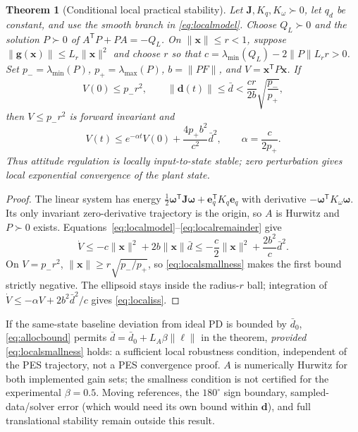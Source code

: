 \documentclass[letterpaper, 10 pt, conference]{ieeeconf}
\newtheorem{theorem}{Theorem}
\newcommand{\T}{^{\mathsf T}}
\begin{document}
\begin{theorem}[Conditional local practical stability]
\label{thm:local}
Let $\bm J,K_q,K_\omega\succ0$, let $q_d$ be constant, and use the smooth
branch in \eqref{eq:localmodel}. Choose $Q_L\succ0$ and the solution
$P\succ0$ of $A\T P+PA=-Q_L$. On $\|\bm x\|\le r<1$, suppose
$\|\bm g(\bm x)\|\le L_r\|\bm x\|^2$ and choose $r$ so that
$c=\lambda_{\min}(Q_L)-2\|P\|L_r r>0$.
Set $p_- =\lambda_{\min}(P)$, $p_+=\lambda_{\max}(P)$,
$b=\|PF\|$, and $V=\bm x\T P\bm x$. If
\begin{equation}
 V(0)\le p_-r^2,\qquad
 \|\bm d(t)\|\le\bar d<\frac{cr}{2b}\sqrt{\frac{p_-}{p_+}},
 \label{eq:localsmallness}
\end{equation}
then $V\le p_-r^2$ is forward invariant and
\begin{equation}
 V(t)\le e^{-\alpha t}V(0)+\frac{4p_+b^2}{c^2}\bar d^2,
 \qquad \alpha=\frac{c}{2p_+}.
 \label{eq:localiss}
\end{equation}
Thus attitude regulation is locally input-to-state stable; zero
perturbation gives local exponential convergence of the plant state.
\end{theorem}
\begin{proof}
The linear system has energy
$\frac12\bm\omega\T\bm J\bm\omega+\bm e_q\T K_q\bm e_q$ with derivative
$-\bm\omega\T K_\omega\bm\omega$. Its only invariant zero-derivative
trajectory is the origin, so $A$ is Hurwitz and $P\succ0$ exists.
Equations~\eqref{eq:localmodel}--\eqref{eq:localremainder} give
\[
 \dot V\le-c\|\bm x\|^2+2b\|\bm x\|\bar d
 \le-\frac c2\|\bm x\|^2+\frac{2b^2}{c}\bar d^2.
\]
On $V=p_-r^2$, $\|\bm x\|\ge r\sqrt{p_-/p_+}$, so
\eqref{eq:localsmallness} makes the first bound strictly negative.
The ellipsoid stays inside the radius-$r$ ball; integration of
$\dot V\le-\alpha V+2b^2\bar d^2/c$ gives \eqref{eq:localiss}.
\end{proof}

If the same-state baseline deviation from ideal PD is bounded by $\bar d_0$,
\eqref{eq:allocbound} permits $\bar d=\bar d_0+L_A\beta\|\bm\ell\|$ in the
theorem, \emph{provided} \eqref{eq:localsmallness} holds: a sufficient
local robustness condition, independent of the PES trajectory, not a PES
convergence proof. $A$ is numerically Hurwitz for both implemented gain
sets; the smallness condition is not certified for the experimental
$\beta=0.5$. Moving references, the $180^\circ$ sign boundary,
sampled-data/solver error (which would need its own bound within $\bm d$),
and full translational stability remain outside this result.
\end{document}
